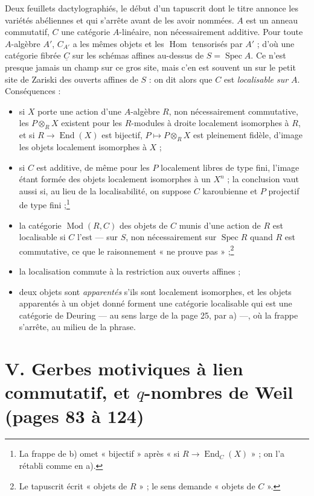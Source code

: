 \documentclass[11pt,a4paper]{article}
\begin{document}
Deux feuillets dactylographiés, le début d'un tapuscrit dont le titre annonce
les variétés abéliennes et qui s'arrête avant de les avoir nommées. $A$ est un
anneau commutatif, $C$ une catégorie $A$-linéaire, non nécessairement additive.
Pour toute $A$-algèbre $A'$, $C_{A'}$ a les mêmes objets et les
$\operatorname{Hom}$ tensorisés par $A'$ ; d'où une catégorie fibrée
$\underline{C}$ sur les schémas affines au-dessus de $S = \operatorname{Spec}
A$. Ce n'est presque jamais un champ sur ce gros site, mais c'en est souvent un
sur le petit site de Zariski des ouverts affines de $S$ : on dit alors que $C$
est \emph{localisable sur $A$}. Conséquences :
\begin{itemize}
  \item[a)] si $X$ porte une action d'une $A$-algèbre $R$, non nécessairement
  commutative, les $P \otimes_{R} X$ existent pour les $R$-modules à droite
  localement isomorphes à $R$, et si $R \to \operatorname{End}(X)$ est
  bijectif, $P \mapsto P \otimes_{R} X$ est pleinement fidèle, d'image les objets
  localement isomorphes à $X$ ;
  \item[b)] si $C$ est additive, de même pour les $P$ localement libres de type
  fini, l'image étant formée des objets localement isomorphes à un $X^{n}$ ; la
  conclusion vaut aussi si, au lieu de la localisabilité, on suppose $C$
  karoubienne et $P$ projectif de type fini ;\footnote{La frappe de b) omet
  « bijectif » après « si $R \to \operatorname{End}_{C}(X)$ » ; on l'a rétabli
  comme en a).}
  \item[c)] la catégorie $\operatorname{Mod}(R, C)$ des objets de $C$ munis
  d'une action de $R$ est localisable si $C$ l'est --- sur $S$, non
  nécessairement sur $\operatorname{Spec} R$ quand $R$ est commutative, ce que le
  raisonnement « ne prouve pas » ;\footnote{Le tapuscrit écrit « objets de
  $R$ » ; le sens demande « objets de $C$ ».}
  \item[d)] la localisation commute à la restriction aux ouverts affines ;
  \item[e)] deux objets sont \emph{apparentés} s'ils sont localement
  isomorphes, et les objets apparentés à un objet donné forment une catégorie
  localisable qui est une catégorie de Deuring --- au sens large de la page 25,
  par a) ---, où la frappe s'arrête, au milieu de la phrase.
\end{itemize}

\section*{V. Gerbes motiviques à lien commutatif, et $q$-nombres de Weil (pages 83 à 124)}
\end{document}

